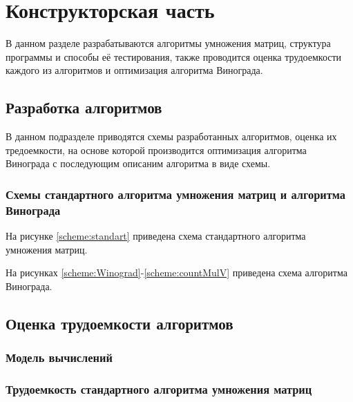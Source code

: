 \chapter{Конструкторская часть}

В данном разделе разрабатываются алгоритмы умножения матриц, структура
программы и способы её тестирования, также проводится оценка трудоемкости
каждого из алгоритмов и оптимизация алгоритма Винограда.

\section{Разработка алгоритмов}

В данном подразделе приводятся схемы разработанных алгоритмов, оценка их
тредоемкости, на основе которой производится оптимизация алгоритма Винограда с
последующим описаним алгоритма в виде схемы.

\subsection{Схемы стандартного алгоритма умножения матриц и алгоритма
            Винограда}

На рисунке \ref{scheme:standart} приведена схема стандартного алгоритма умножения
матриц.

\noindent
{}

На рисунках \ref{scheme:Winograd}-\ref{scheme:countMulV} приведена схема
алгоритма Винограда.

\noindent
{}
\noindent
{}
\noindent
{}

\section{Оценка трудоемкости алгоритмов}

\subsection{Модель вычислений}

\subsection{Трудоемкость стандартного алгоритма умножения матриц}

